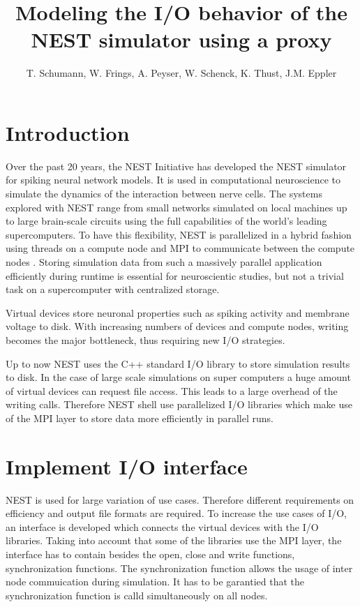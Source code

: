 \documentclass[]{YIC2015}
\title{Modeling the I/O behavior of the NEST simulator using a proxy}
\author[T. Schumann et al.]{%
  T. Schumann\authref{a}\corref,
  W. Frings\authref{b},
  A. Peyser\authref{c},
  W. Schenck\authref{c},
  K. Thust\authref{b},
  J.M. Eppler\authref{c}
}
\begin{document}
\maketitle

\section{Introduction}
%
Over the past 20 years, the NEST Initiative \cite{NESTInitiative} has developed the NEST
\cite{NEST} simulator for spiking neural network models. It is used in
computational neuroscience to simulate the dynamics of the interaction
between nerve cells. The systems explored with NEST range from small
networks simulated on local machines up to large brain-scale circuits
using the full capabilities of the world's leading supercomputers. To
have this flexibility, NEST is parallelized in a hybrid fashion
using threads on a compute node and MPI to communicate between the
compute nodes \cite{Plesser07}.  Storing simulation data from such a
massively parallel application efficiently during runtime is essential
for neuroscientic studies, but not a trivial task on a supercomputer
with centralized storage.

Virtual devices store neuronal properties such as spiking activity
and membrane voltage to disk. With increasing numbers of devices and
compute nodes, writing becomes the major bottleneck, thus requiring
new I/O strategies.

Up to now NEST uses the C++ standard I/O library to store simulation results to disk.
In the case of large scale simulations on super computers a huge amount of virtual devices can request file access.
This leads to a large overhead of the writing calls.
Therefore NEST shell use parallelized I/O libraries which make use of the MPI layer to store data more efficiently in parallel runs.

\section{Implement I/O interface}
NEST is used for large variation of use cases.
Therefore different requirements on efficiency and output file formats are required.
To increase the use cases of I/O, an interface is developed which connects the virtual devices with the I/O libraries.
Taking into account that some of the libraries use the MPI layer,
the interface has to contain besides the open, close and write functions, synchronization functions.
The synchronization function allows the usage of inter node commuication during simulation.
It has to be garantied that the synchronization function is calld simultaneously on all nodes.
\end{document}
